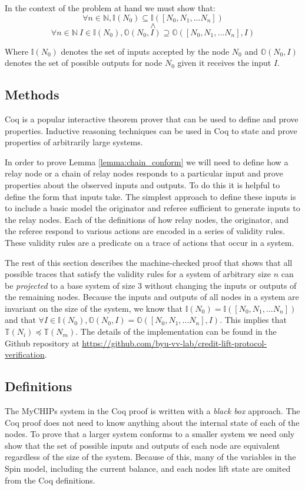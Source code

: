 \documentclass[runningheads]{llncs}
\newcommand{\inputset}[1]{\mathds{I}(#1)}
\newcommand{\outputset}[2]{\mathds{O}(#1, #2)}
\newcommand{\tracestruc}[1]{\mathds{T}(#1)}
\newcommand{\coderepository}{Github repository at \url{https://github.com/byu-vv-lab/credit-lift-protocol-verification}}
\begin{document}
In the context of the problem at hand we must show that:
$$\forall n \in \mathds{N}, 
\inputset{N_0} \subseteq \inputset{[N_0, N_1, ... N_n]}$$
$$\wedge$$
$$ \forall n \in \mathds{N}\ I \in \inputset{N_0}, \outputset{N_0}{I} \supseteq \outputset{[N_0, N_1, ... N_n]}{I} $$

Where $\inputset{N_0}$ denotes the set of inputs accepted by the node $N_0$ and $\outputset{N_0}{I}$ denotes the set of possible outputs for node $N_0$ given it receives the input $I$. 


\subsection{Methods}
Coq is a popular interactive theorem prover that can be used to define and prove properties. Inductive reasoning techniques can be used in Coq to state and prove properties of arbitrarily large systems. 


In order to prove Lemma \ref{lemma:chain_conform} we will need to define how a relay node or a chain of relay nodes responds to a particular input and prove properties about the observed inputs and outputs. To do this it is helpful to define the form that inputs take. The simplest approach to define these inputs is to include a basic model the originator and referee sufficient to generate inputs to the relay nodes. 
Each of the definitions of how relay nodes, the originator, and the referee respond to various actions are encoded in a series of validity rules. These validity rules are a predicate on a trace of actions that occur in a system.

The rest of this section describes the machine-checked proof that shows that all possible traces that satisfy the validity rules for a system of arbitrary size $n$ can be \emph{projected} to a base system of size $3$ without changing the inputs or outputs of the remaining nodes. Because the inputs and outputs of all nodes in a system are invariant on the size of the system, we know that 
$\inputset{N_0} = \inputset{[N_0, N_1, ... N_n]}$ and that $\forall I \in \inputset{N_0}, \outputset{N_0}{I} = \outputset{[N_0, N_1, ... N_n]}{I}$.
This implies that
$\tracestruc{N_i} \preceq \tracestruc{N_m}$.
The details of the implementation can be 
found in the \coderepository.

\subsection{Definitions} \label{sec:definitions}
The MyCHIPs system in the Coq proof is written with a \emph{black box} approach. The Coq proof does not need to know anything about the internal state of each of the nodes. To prove that a larger system conforms to a smaller system we need only show that the set of possible inputs and outputs of each node are equivalent regardless of the size of the system. Because of this, many of the variables in the Spin model, including the current balance, and each nodes lift state are omited from the Coq definitions. 
\end{document}
